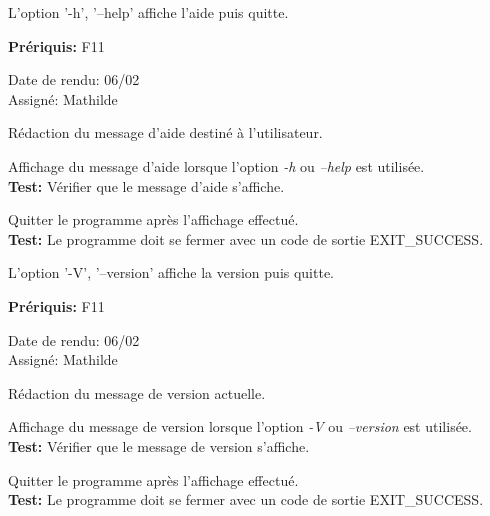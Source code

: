\documentclass{article}
\begin{document}
\begin{needbox}
    L'option '-h', '--help' affiche l'aide puis quitte.

    \textbf{Prériquis:} F11
    \begin{duedatebox}
        Date de rendu: 06/02\\
        Assigné: Mathilde
    \end{duedatebox}
    \begin{subneedbox}[F16.1: Texte]
        Rédaction du message d'aide destiné à l'utilisateur.
    \end{subneedbox}
    \begin{subneedbox}[F16.2: Affichage]
        Affichage du message d'aide lorsque l'option \textit{-h} ou \textit{--help} est utilisée.\\
        \textbf{Test:} Vérifier que le message d'aide s'affiche.
    \end{subneedbox}
    \begin{subneedbox}[F16.3: Quitter]
        Quitter le programme après l'affichage effectué.\\
        \textbf{Test:} Le programme doit se fermer avec un code de sortie EXIT\_SUCCESS.
    \end{subneedbox}
\end{needbox}

\begin{needbox}[F17: Version ]
    L'option '-V', '--version' affiche la version puis quitte.

    \textbf{Prériquis:} F11
    \begin{duedatebox}
        Date de rendu: 06/02\\
        Assigné: Mathilde
    \end{duedatebox}
    \begin{subneedbox}[F17.1: Texte]
        Rédaction du message de version actuelle.
    \end{subneedbox}
    \begin{subneedbox}[F17.2: Affichage]
        Affichage du message de version lorsque l'option \textit{-V} ou \textit{--version} est utilisée.\\
        \textbf{Test:} Vérifier que le message de version s'affiche.
    \end{subneedbox}
    \begin{subneedbox}[F17.3: Quitter]
        Quitter le programme après l'affichage effectué.\\
        \textbf{Test:} Le programme doit se fermer avec un code de sortie EXIT\_SUCCESS.
    \end{subneedbox}
\end{needbox}
\end{document}
